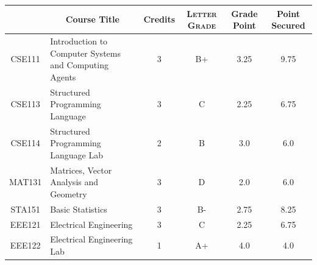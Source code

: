 \documentclass[11pt]{article}
\newcommand*{\numtwo}[1]{\pgfmathprintnumber[
                    fixed, precision=2, fixed zerofill=true]{#1}}
\begin{document}
                \begin{center}
                    \renewcommand{\arraystretch}{1.08}
                    
                \begin{tabular}{|c|l|c|>{\scshape}c|c|c|}
                \hline  \rule[-1ex]{0pt}{3.5ex} {\centering{\bf Course Code}} &  \multicolumn{1}{c|}{\textbf{Course Title}}  & {\bf Credits} & {\bf Letter Grade} & {\bf Grade Point} & {\bf Point Secured}  \\ 
                \hline   CSE111 &  Introduction to Computer Systems and Computing Agents		 & 3 & B+ & 3.25 & 9.75 \\ %
                \hline   CSE113 &  Structured Programming Language		 & 3 & C & 2.25 & 6.75 \\ %
                \hline   CSE114 &  Structured Programming Language Lab		 & 2 & B & 3.0 & 6.0 \\ %
                \hline   MAT131 &  Matrices, Vector Analysis and Geometry		 & 3 & D & 2.0 & 6.0 \\ %
                \hline   STA151 &  Basic Statistics		 & 3 & B- & 2.75 & 8.25 \\ %
                \hline   EEE121 &  Electrical Engineering		 & 3 & C & 2.25 & 6.75 \\ %
                \hline   EEE122 &  Electrical Engineering Lab		 & 1 & A+ & 4.0 & 4.0 \\ %

\hline                %
                \end{tabular}
                \end{center}
                \renewcommand{\arraystretch}{1.03}
\end{document}
